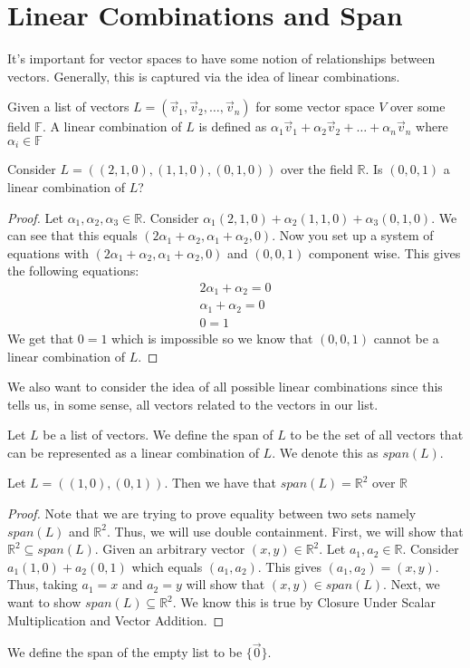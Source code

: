 \section{Linear Combinations and Span}
It's important for vector spaces to have some notion of relationships between vectors. Generally, this is captured via the idea of linear combinations.
\begin{definition}
    Given a list of vectors $L=(\vec{v}_1,\vec{v}_2,\ldots,\vec{v}_n)$ for some vector space $V$ over some field $\mathbb{F}$. A linear combination of $L$ is defined as $\alpha_1\vec{v}_1+\alpha_2\vec{v}_2+\ldots+\alpha_n\vec{v}_n$ where $\alpha_i\in\mathbb{F}$
\end{definition}
\begin{example}
    Consider $L=((2,1,0), (1,1,0),(0,1,0))$ over the field $\mathbb{R}$. Is $(0,0,1)$ a linear combination of $L$?
    \begin{proof}
        Let $\alpha_1,\alpha_2,\alpha_3\in\mathbb{R}$. Consider $\alpha_1(2,1,0)+\alpha_2(1,1,0)+\alpha_3(0,1,0)$. We can see that this equals $(2\alpha_1+\alpha_2,\alpha_1+\alpha_2,0)$. Now you set up a system of equations with $(2\alpha_1+\alpha_2,\alpha_1+\alpha_2,0)$ and $(0,0,1)$ component wise. This gives the following equations:
        \begin{align*}
            2\alpha_1+\alpha_2=0\\
            \alpha_1+\alpha_2=0\\
            0=1
        \end{align*}
        We get that $0=1$ which is impossible so we know that $(0,0,1)$ cannot be a linear combination of $L$.
    \end{proof}
\end{example}
We also want to consider the idea of all possible linear combinations since this tells us, in some sense, all vectors related to the vectors in our list.
\begin{definition}
    Let $L$ be a list of vectors. We define the span of $L$ to be the set of all vectors that can be represented as a linear combination of $L$. We denote this as $span(L)$.
\end{definition}
\begin{theorem}
    Let $L=((1,0),(0,1))$. Then we have that $span(L)=\mathbb{R}^2$ over $\mathbb{R}$
\end{theorem}
\begin{proof}
    Note that we are trying to prove equality between two sets namely $span(L)$ and $\mathbb{R}^2$. Thus, we will use double containment.
    First, we will show that $\mathbb{R}^2\subseteq span(L)$. Given an arbitrary vector $(x,y)\in\mathbb{R}^2$. Let $a_1,a_2\in\mathbb{R}$. Consider $a_1(1,0)+a_2(0,1)$ which equals $(a_1,a_2)$. This gives $(a_1,a_2)=(x,y)$. Thus, taking $a_1=x$ and $a_2=y$ will show that $(x,y)\in span(L)$. Next, we want to show $span(L)\subseteq\mathbb{R}^2$. We know this is true by Closure Under Scalar Multiplication and Vector Addition.
\end{proof}
\begin{remark}
    We define the span of the empty list to be $\{\vec{0}\}$.
\end{remark}

